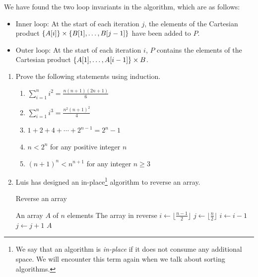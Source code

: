 \begin{example}
   We have found the two loop invariants in the algorithm, which are as follows:
   \begin{itemize}
       \item Inner loop: At the start of each iteration $j$, the elements of the Cartesian product $\left\{A[i]\right\} \times \left\{B[1],\ldots,B[j-1]\right\}$ have been added to $P$.

       \item Outer loop: At the start of each iteration $i$, $P$ contains the elements of the Cartesian product $\left\{A[1],\ldots,A[i-1]\right\} \times B$.
   \end{itemize}
\end{example}

\begin{exercises}
    \begin{enumerate}
        \item Prove the following statements using induction.
            \begin{enumerate}
                \item $\displaystyle\sum_{i=1}^n i^2 = \frac{n\left(n+1\right)\left(2n+1\right)}{6}$
                \item $\displaystyle\sum_{i=1}^n i^3 = \frac{n^2 \left(n+1\right)^2}{4}$
                \item $1 + 2 + 4 + \cdots + 2^{n-1} = 2^n - 1$
                \item $n < 2^n$ for any positive integer $n$
                \item $\left(n+1\right)^n < n^{n+1}$ for any integer $n \ge 3$
            \end{enumerate}


        \item Luis has designed an in-place\footnote{We say that an algorithm is \textit{in-place} if it does not consume any additional space. We will encounter this term again when we talk about sorting algorithms.} algorithm to reverse an array.
            \begin{algorithm}[H]
                \caption{Reverse an array}
                \begin{algorithmic}[1]
                    \Require An array $A$ of $n$ elements
                    \Ensure The array in reverse
                        \State $i \gets \lfloor\frac{n-1}{2}\rfloor$
                        \State $j \gets \lfloor\frac{n}{2}\rfloor$
                            \State {}
                            \State $i \gets i-1$
                            \State $j \gets j+1$
                        \EndWhile
                        \Return $A$
                    \EndFunction
                \end{algorithmic}
           \end{algorithm}


\end{enumerate}
\end{exercises}
